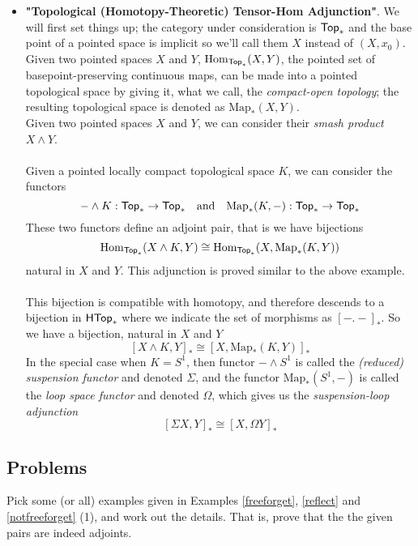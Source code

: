 \begin{example}
\begin{itemize}[itemsep=1em]
\item \textbf{"Topological (Homotopy-Theoretic) Tensor-Hom Adjunction"}. We will first set things up; the category under consideration is $\mathsf{Top}_*$ and the base point of a pointed space is implicit so we'll call them $X$ instead of $(X,x_0)$.\\[1em]
Given two pointed spaces $X$ and $Y$, $\mathrm{Hom}_{\mathsf{Top}_*}(X,Y)$, the pointed set of basepoint-preserving continuous maps, can be made into a pointed topological space by giving it, what we call, the \emph{compact-open topology}; the resulting topological space is denoted as $\mathrm{Map}_*(X,Y)$.\\[1em]
Given two pointed spaces $X$ and $Y$, we can consider their \emph{smash product} $X \wedge Y$.\\
\\
Given a pointed locally compact topological space $K$, we can consider the functors
\[- \wedge K:\mathsf{Top}_* \to \mathsf{Top}_* \quad \text{and} \quad \mathrm{Map}_*(K,-):\mathsf{Top}_* \to \mathsf{Top}_*\]
These two functors define an adjoint pair, that is we have bijections
\[\mathrm{Hom}_{\mathsf{Top}_*}(X\wedge K,Y) \cong \mathrm{Hom}_{\mathsf{Top}_*}(X,\mathrm{Map}_*(K,Y))\]
natural in $X$ and $Y$. This adjunction is proved similar to the above example.\\
\\
This bijection is compatible with homotopy, and therefore descends to a bijection in $\mathsf{HTop}_*$ where we indicate the set of morphisms as $[-.-]_*$. So we have a bijection, natural in $X$ and $Y$
\[[X\wedge K,Y]_* \cong [X,\mathrm{Map}_*(K,Y)]_*\]
In the special case when $K = S^1$, then functor $-\wedge S^1$ is called the \emph{(reduced) suspension functor} and denoted $\Sigma$, and the functor $\mathrm{Map}_*(S^1,-)$ is called the \emph{loop space functor} and denoted $\Omega$, which gives us the \emph{suspension-loop adjunction}
\[[\Sigma X,Y]_* \cong [X,\Omega Y]_*\]
\end{itemize}
\end{example}

\vspace*{0.2in}

\subsection{Problems}\vspace{0.1in}

\begin{problem}\label{prob 8.1}
Pick some (or all) examples given in Examples \ref{freeforget}, \ref{reflect} and \ref{notfreeforget} (1), and work out the details. That is, prove that the the given pairs are indeed adjoints.%
\end{problem}

